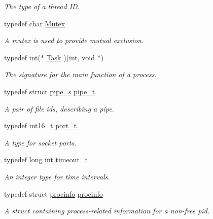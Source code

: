 \begin{DoxyCompactItemize}
\begin{DoxyCompactList}\small\item\em The type of a thread I\-D. \end{DoxyCompactList}\item 
typedef char \hyperlink{group__syscalls_gaef2ec62cae8e0031fd19fc8b91083ade}{Mutex}
\begin{DoxyCompactList}\small\item\em A mutex is used to provide mutual exclusion. \end{DoxyCompactList}\item 
typedef int($\ast$ \hyperlink{group__syscalls_ga0c7678964128d7fccc9ce98528494f4a}{Task} )(int, void $\ast$)
\begin{DoxyCompactList}\small\item\em The signature for the main function of a process. \end{DoxyCompactList}\item 
typedef struct \hyperlink{structpipe__s}{pipe\-\_\-s} \hyperlink{group__syscalls_gad56b5ceaaf7d3ab88b4be7f622314dfb}{pipe\-\_\-t}
\begin{DoxyCompactList}\small\item\em A pair of file ids, describing a pipe. \end{DoxyCompactList}\item 
typedef int16\-\_\-t \hyperlink{group__syscalls_ga13894e5a2ffd5febb7aeb90e87239d61}{port\-\_\-t}
\begin{DoxyCompactList}\small\item\em A type for socket ports. \end{DoxyCompactList}\item 
typedef long int \hyperlink{group__syscalls_ga036799055f409d83712b8c366aaa10d3}{timeout\-\_\-t}
\begin{DoxyCompactList}\small\item\em An integer type for time intervals. \end{DoxyCompactList}\item 
typedef struct \hyperlink{structprocinfo}{procinfo} \hyperlink{group__syscalls_ga9682d9066f643f8d18cff58fd3fb09b9}{procinfo}
\begin{DoxyCompactList}\small\item\em A struct containing process-\/related information for a non-\/free pid. \end{DoxyCompactList}\end{DoxyCompactItemize}
